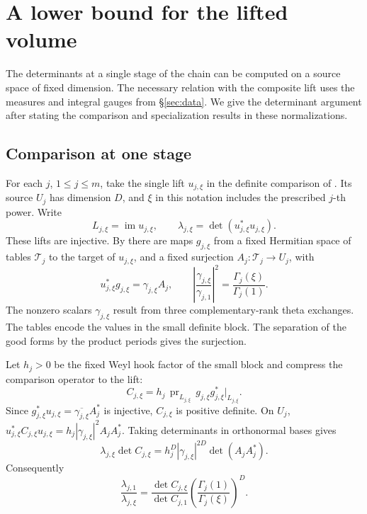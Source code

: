 \documentclass[11pt,reqno]{amsart}
\theoremstyle{definition}
\numberwithin{equation}{section}
\begin{document}
\section{A lower bound for the lifted volume}\label{sec:long}

The determinants at a single stage of the chain can be
computed on a source space of fixed dimension. The necessary
relation with the composite lift uses the measures and
integral gauges from \S\ref{sec:data}. We give the determinant
argument after stating the comparison and specialization
results in these normalizations.

\subsection{Comparison at one stage}

For each \(j\), \(1\le j\le m\), take the single lift
\(u_{j,\xi}\) in the definite comparison
of \cite[\S13.9]{chojecki}. Its source \(U_j\) has dimension
\(D\), and \(\xi\) in this notation includes the prescribed
\(j\)-th power. Write
\[
 L_{j,\xi}=\operatorname{im}u_{j,\xi},\qquad
 \lambda_{j,\xi}=\det(u_{j,\xi}^*u_{j,\xi}).
\]
These lifts are injective. By
\cite[Proposition~14.10]{chojecki} there are maps
\(g_{j,\xi}\) from a fixed Hermitian space of tables
\(\mathcal T_j\) to the target of \(u_{j,\xi}\), and a fixed
surjection \(A_j:\mathcal T_j\to U_j\), with
\begin{equation}\label{eq:comparison-adj}
 u_{j,\xi}^*g_{j,\xi}=\gamma_{j,\xi} A_j,\qquad
 \left|\frac{\gamma_{j,\xi}}{\gamma_{j,1}}\right|^2
          =\frac{\Gamma_j(\xi)}{\Gamma_j(1)}.
\end{equation}
The nonzero scalars \(\gamma_{j,\xi}\) result from three
complementary-rank theta exchanges. The tables encode
the values in the small definite block. The separation
of the good forms by the product periods
\cite[Proposition~14.21]{chojecki} gives the surjection.

Let \(h_j>0\) be the fixed Weyl hook factor of the small
block and compress the comparison operator to the lift:
\[
 C_{j,\xi}=h_j\,\operatorname{pr}_{L_{j,\xi}}\,
                   g_{j,\xi}g_{j,\xi}^*\big|_{L_{j,\xi}}.
\]
Since \(g_{j,\xi}^*u_{j,\xi}=\overline{\gamma_{j,\xi}}A_j^*\)
is injective, \(C_{j,\xi}\) is positive definite. On \(U_j\),
\(u_{j,\xi}^*C_{j,\xi}u_{j,\xi}=h_j|\gamma_{j,\xi}|^2 A_jA_j^*\).
Taking determinants in orthonormal bases gives
\[
 \lambda_{j,\xi}\det C_{j,\xi}
   = h_j^D|\gamma_{j,\xi}|^{2D}\det(A_jA_j^*).
\]
Consequently
\begin{equation}\label{eq:comparison-ratio}
 \frac{\lambda_{j,1}}{\lambda_{j,\xi}}
 = \frac{\det C_{j,\xi}}{\det C_{j,1}}
        \left(\frac{\Gamma_j(1)}{\Gamma_j(\xi)}\right)^D.
\end{equation}
\end{document}
